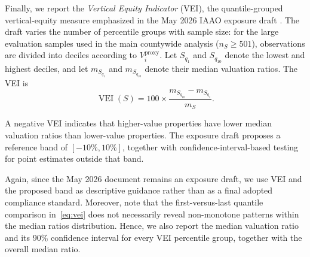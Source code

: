 \documentclass[10pt]{article}
\theoremstyle{definition}
\newcommand{\1}{\mathbf{1}}
\begin{document}
Finally, we report the \emph{Vertical Equity Indicator} (VEI), the quantile-grouped vertical-equity measure emphasized in the May 2026 IAAO exposure draft \cite{IAAO2026ExposureRatio}.
The draft varies the number of percentile groups with sample size: for the large evaluation samples used in the main countywide analysis ($n_S\geq 501$), observations are divided into deciles according to $V_i^{\mathrm{proxy}}$. Let $S_{q_1}$ and $S_{q_{10}}$ denote the lowest and highest deciles, and let $m_{S_{q_1}}$ and $m_{S_{q_{10}}}$ denote their median valuation ratios. The VEI is
\begin{equation}
\label{eq:vei}
\operatorname{VEI}(S)
=
100\times
\frac{m_{S_{q_{10}}}-m_{S_{q_1}}}{m_S}.
\end{equation}

A negative VEI indicates that higher-value properties have lower median valuation ratios than lower-value properties. The exposure draft proposes a reference band of $[-10\%,10\%]$, together with confidence-interval-based testing for point estimates outside that band.

{Again, since the May 2026 document remains an exposure draft, we use VEI and the proposed band as descriptive guidance rather than as a final adopted compliance standard. Moreover, note that the first-versus-last quantile comparison in~\eqref{eq:vei} does not necessarily reveal non-monotone patterns within the median ratios distribution. Hence, we also report the median valuation ratio and its 90\% confidence interval for every VEI percentile group, together with the overall median ratio.} 




\end{document}
